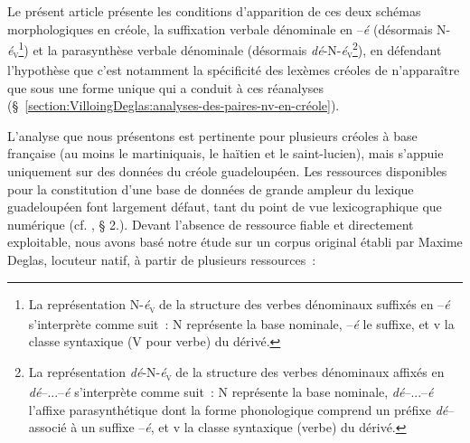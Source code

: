 \documentclass[output=paper]{langsci/langscibook}
\begin{document}
Le présent article présente les conditions d'apparition de ces deux
schémas morphologiques en créole, la suffixation verbale dénominale en
--\emph{é} (désormais N-\emph{é}\textsubscript{\textsc{v}}\footnote{La
  représentation N-\emph{é}\textsubscript{\textsc{v}} de la structure des verbes
  dénominaux suffixés en --\emph{é} s'interprète comme suit~: N
  représente la base nominale, --\emph{é} le suffixe, et v la classe syntaxique
  (V pour verbe) du dérivé. }) et la parasynthèse verbale dénominale
(désormais \emph{dé}-N-\emph{é}\textsubscript{\textsc{v}}\footnote{La
  représentation \emph{dé}-N-\emph{é}\textsubscript{\textsc{v}} de la structure des verbes
  dénominaux affixés en \emph{dé}--...--\emph{é} s'interprète comme suit~: N
  représente la base nominale, \emph{dé}--...--\emph{é} l'affixe parasynthétique dont la
  forme phonologique comprend un préfixe \emph{dé}-- associé à un suffixe --\emph{é}, et
  v la classe syntaxique (verbe) du dérivé. }), en défendant
l'hypothèse que c'est notamment la spécificité des lexèmes créoles de
n'apparaître que sous une forme unique qui a conduit à ces réanalyses (§~\ref{section:VilloingDeglas:analyses-des-paires-nv-en-créole}).

L'analyse que nous présentons est pertinente pour plusieurs créoles à
base française (au moins le martiniquais, le haïtien et le
saint-lucien), mais s'appuie uniquement sur des données du créole
guadeloupéen. Les ressources disponibles pour la constitution d'une base
de données de grande ampleur du lexique guadeloupéen font largement
défaut, tant du point de vue lexicographique que numérique %
(cf. 
\citealt{Villoing16}%
%
, § 2.).
%
Devant l'absence de ressource fiable et
directement exploitable, nous avons basé notre étude sur un corpus
original établi par Maxime Deglas, locuteur natif, à partir de plusieurs
ressources~:
\end{document}
